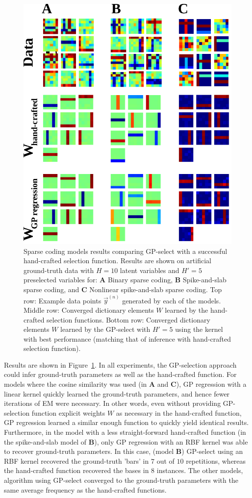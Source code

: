 \begin{figure}[t]
\begin{center}
\includegraphics[width=.45\textwidth]{figs/sparsecoding/bars-test.pdf}
\caption{Sparse coding models results comparing GP-select with a successful hand-crafted selection function.
Results are shown on artificial ground-truth data with $H=10$ latent variables and $H'=5$ preselected variables for: \textbf{A} Binary sparse coding, \textbf{B} Spike-and-slab sparse coding, and \textbf{C} Nonlinear spike-and-slab sparse coding.
Top row: Example data points $\vec{y}^{(n)}$ generated by each of the models.
Middle row: Converged dictionary elements $W$ learned by the hand-crafted selection functions.
Bottom row: Converged dictionary elements $W$ learned by the GP-select with $H'=5$ using the kernel with best performance (matching that of inference with hand-crafted selection function).
}\label{fig:sparse}
\end{center}
\end{figure}

Results are shown in Figure~\ref{fig:sparse}.
In all experiments, the GP-selection approach could infer ground-truth parameters as well as the hand-crafted function.
For models where the cosine similarity was used (in \textbf{A} and \textbf{C}), GP regression with a linear kernel quickly learned the ground-truth parameters, and hence fewer iterations of EM were necessary.
In other words, even without providing GP-selection function explicit weights $W$ as necessary in the hand-crafted function, GP regression learned a similar enough function to quickly yield identical results.
Furthermore, in the model with a less straight-forward hand-crafted function (in the spike-and-slab model of \textbf{B}), only GP regression with an RBF kernel was able to recover ground-truth parameters.
In this case, (model \textbf{B}) GP-select using an RBF kernel recovered the ground-truth 'bars' in $7$ out of $10$ repetitions, whereas the hand-crafted function recovered the bases in $8$ instances.
The other models, algorithm using GP-select converged to the ground-truth parameters with the same average frequency as the hand-crafted functions.

